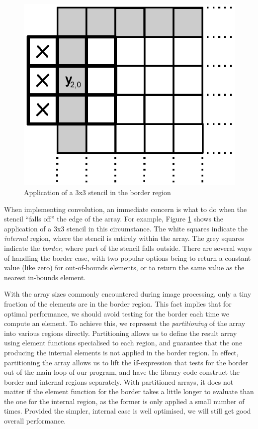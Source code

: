 \begin{figure}
\begin{center}
\includegraphics[scale=0.5]{figs/StencilBorder.eps}
\end{center}
\caption{Application of a 3x3 stencil in the border region}
\label{fig:StencilBorder}
\end{figure}

When implementing convolution, an immediate concern is what to do when the stencil ``falls off'' the edge of the array. For example, Figure \ref{fig:StencilBorder} shows the application of a 3x3 stencil in this circumstance. The white squares indicate the \emph{internal} region, where the stencil is entirely within the array. The grey squares indicate the \emph{border}, where part of the stencil falls outside. There are several ways of handling the border case, with two popular options being to return a constant value (like zero) for out-of-bounds elements, or to return the same value as the nearest in-bounds element. 

With the array sizes commonly encountered during image processing, only a tiny fraction of the elements are in the border region. This fact implies that for optimal performance, we should avoid testing for the border each time we compute an element. To achieve this, we represent the \emph{partitioning} of the array into various regions directly. Partitioning allows us to define the result array using element functions specialised to each region, and guarantee that the one producing the internal elements is not applied in the border region. In effect, partitioning the array allows us to lift the \textbf{if}-expression that tests for the border out of the main loop of our program, and have the library code construct the border and internal regions separately. With partitioned arrays, it does not matter if the element function for the border takes a little longer to evaluate than the one for the internal region, as the former is only applied a small number of times. Provided the simpler, internal case is well optimised, we will still get good overall performance. 


